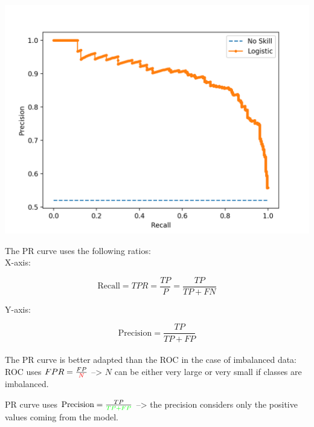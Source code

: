 \includegraphics[scale=0.5]{PR_curve.png}

The PR curve uses the following ratios: \\

X-axis:

$$\text{Recall} = TPR = \frac{TP}{P} = \frac{TP}{TP + FN}$$

Y-axis:

$$\text{Precision} = \frac{TP}{TP + FP}$$ \\

The PR curve is better adapted than the ROC in the case of imbalanced data: \\

ROC uses $FPR = \frac{FP}{\textcolor{red}{N}} $ --> $N$ can be either very large or very small if classes are imbalanced.

PR curve uses $\text{Precision} = \frac{TP}{\textcolor{green}{TP + FP}}$ --> the precision considers only the positive values coming from the model.



\vspace{5mm}
